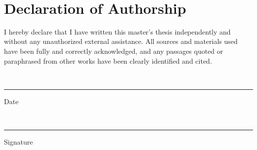 
\maketitle
\clearpage

\ifdigital\else
  ~
  \newpage                      %
\fi


%
%



%

\vspace{10ex}
\section*{Declaration of Authorship}
I hereby declare that I have written this master's thesis independently and
without any unauthorized external assistance. All sources and materials used
have been fully and correctly acknowledged, and any passages quoted or
paraphrased from other works have been clearly identified and cited.


\vspace{12ex}

\noindent
\begin{minipage}[b]{0.45\textwidth}
  \thedatum\\[1ex]
  \hrule
  \vspace{0.6ex}
  {\small Date}
\end{minipage}
\hfill
\begin{minipage}[b]{0.45\textwidth}
  \theautor\\[1ex]
  \hrule
  \vspace{0.6ex}
  {\small Signature}
\end{minipage}

\clearpage
\tableofcontents
\listoffigures
\clearpage
